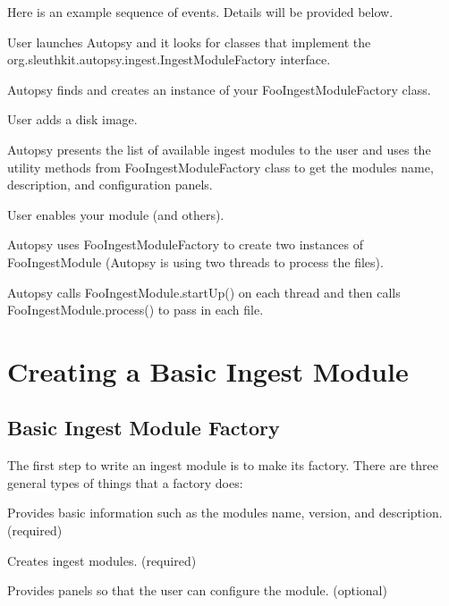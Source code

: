 Here is an example sequence of events. Details will be provided below.
\begin{DoxyEnumerate}
\item User launches Autopsy and it looks for classes that implement the org.\+sleuthkit.\+autopsy.\+ingest.\+Ingest\+Module\+Factory interface.
\item Autopsy finds and creates an instance of your Foo\+Ingest\+Module\+Factory class.
\item User adds a disk image.
\item Autopsy presents the list of available ingest modules to the user and uses the utility methods from Foo\+Ingest\+Module\+Factory class to get the module\textquotesingle{}s name, description, and configuration panels.
\item User enables your module (and others).
\item Autopsy uses Foo\+Ingest\+Module\+Factory to create two instances of Foo\+Ingest\+Module (Autopsy is using two threads to process the files).
\item Autopsy calls Foo\+Ingest\+Module.\+start\+Up() on each thread and then calls Foo\+Ingest\+Module.\+process() to pass in each file.
\end{DoxyEnumerate}\hypertarget{mod_ingest_page_ingest_modules_implementing_ingestmodulefactory_basic}{}\section{Creating a Basic Ingest Module}\label{mod_ingest_page_ingest_modules_implementing_ingestmodulefactory_basic}
\hypertarget{mod_ingest_page_ingest_modules_implementing_basic_factory}{}\subsection{Basic Ingest Module Factory}\label{mod_ingest_page_ingest_modules_implementing_basic_factory}
The first step to write an ingest module is to make its factory. There are three general types of things that a factory does\+:
\begin{DoxyEnumerate}
\item Provides basic information such as the module\textquotesingle{}s name, version, and description. (required)
\item Creates ingest modules. (required)
\item Provides panels so that the user can configure the module. (optional)
\end{DoxyEnumerate}

